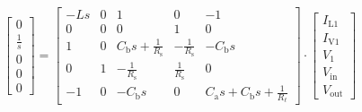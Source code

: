 \begin{equation}
\left[\begin{matrix}0\\\frac{1}{s}\\0\\0\\0\end{matrix}\right]=\left[\begin{matrix}- L s & 0 & 1 & 0 & -1\\0 & 0 & 0 & 1 & 0\\1 & 0 & C_{\mathrm{b}} s + \frac{1}{R_{\mathrm{s}}} & - \frac{1}{R_{\mathrm{s}}} & - C_{\mathrm{b}} s\\0 & 1 & - \frac{1}{R_{\mathrm{s}}} & \frac{1}{R_{\mathrm{s}}} & 0\\-1 & 0 & - C_{\mathrm{b}} s & 0 & C_{\mathrm{a}} s + C_{\mathrm{b}} s + \frac{1}{R_{\ell}}\end{matrix}\right]\cdot \left[\begin{matrix}I_{\mathrm{L1}}\\I_{\mathrm{V1}}\\V_{\mathrm{1}}\\V_{\mathrm{in}}\\V_{\mathrm{out}}\end{matrix}\right]
\label{eq-matrices}
\end{equation}

